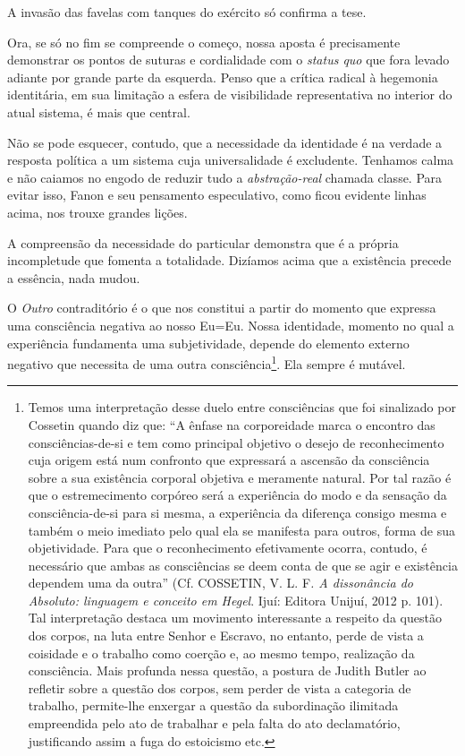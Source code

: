 A invasão das favelas com tanques do exército só confirma a tese.

Ora, se só no fim se compreende o começo, nossa aposta é precisamente
demonstrar os pontos de suturas e cordialidade com o \emph{status quo}
que fora levado adiante por grande parte da esquerda. Penso que a
crítica radical à hegemonia identitária, em sua limitação a esfera de
visibilidade representativa no interior do atual sistema, é mais que
central.

Não se pode esquecer, contudo, que a necessidade da identidade é na
verdade a resposta política a um sistema cuja universalidade é
excludente. Tenhamos calma e não caiamos no engodo de reduzir tudo a
\emph{abstração-real} chamada classe. Para evitar isso, Fanon e seu
pensamento especulativo, como ficou evidente linhas acima, nos trouxe
grandes lições.

A compreensão da necessidade do particular demonstra que é a própria
incompletude que fomenta a totalidade. Dizíamos acima que a existência
precede a essência, nada mudou.

O \emph{Outro} contraditório é o que nos constitui a partir do momento
que expressa uma consciência negativa ao nosso Eu=Eu. Nossa identidade,
momento no qual a experiência fundamenta uma subjetividade, depende do
elemento externo negativo que necessita de uma outra
consciência\footnote{Temos uma interpretação desse duelo entre
  consciências que foi sinalizado por Cossetin quando diz que: ``A
  ênfase na corporeidade marca o encontro das consciências-de-si e tem
  como principal objetivo o desejo de reconhecimento cuja origem está
  num confronto que expressará a ascensão da consciência sobre a sua
  existência corporal objetiva e meramente natural. Por tal razão é que
  o estremecimento corpóreo será a experiência do modo e da sensação da
  consciência-de-si para si mesma, a experiência da diferença consigo
  mesma e também o meio imediato pelo qual ela se manifesta para outros,
  forma de sua objetividade. Para que o reconhecimento efetivamente
  ocorra, contudo, é necessário que ambas as consciências se deem conta
  de que se agir e existência dependem uma da outra'' (Cf. COSSETIN, V.
  L. F\emph{. A dissonância do Absoluto: linguagem e conceito em Hegel}.
  Ijuí: Editora Unijuí, 2012 p. 101). Tal interpretação destaca um
  movimento interessante a respeito da questão dos corpos, na luta entre
  Senhor e Escravo, no entanto, perde de vista a coisidade e o trabalho
  como coerção e, ao mesmo tempo, realização da consciência. Mais
  profunda nessa questão, a postura de Judith Butler ao refletir sobre a
  questão dos corpos, sem perder de vista a categoria de trabalho,
  permite-lhe enxergar a questão da subordinação ilimitada empreendida
  pelo ato de trabalhar e pela falta do ato declamatório, justificando
  assim a fuga do estoicismo etc.}. Ela sempre é mutável.

